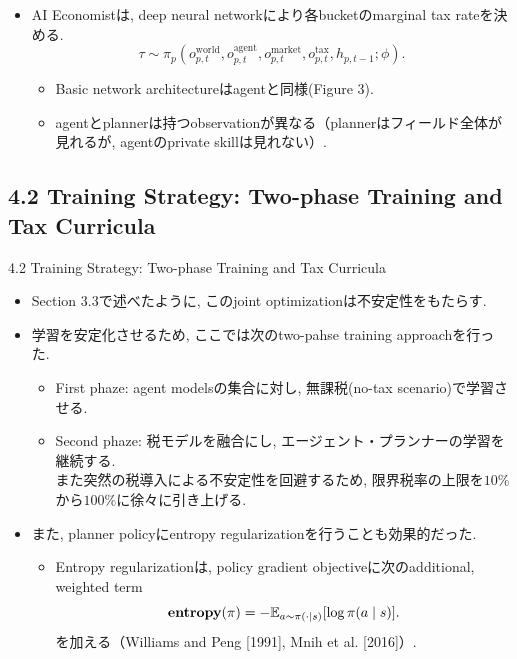 \documentclass[unicode,aspectratio=169,11pt]{beamer}
\begin{document}
\begin{frame}{}{}
    \begin{itemize}
        \item AI Economistは, deep neural networkにより各bucketのmarginal tax rateを決める.
        \[ \tau \sim \pi_p\left( o^{\mathrm{world}}_{p,t}, o^{\mathrm{agent}}_{p,t}, o^{\mathrm{market}}_{p,t}, o^{\mathrm{tax}}_{p,t}, h_{p, t-1} ; \phi \right). \tag{24} \]
        \begin{itemize}
            \item Basic network architectureはagentと同様(Figure 3).
            \item agentとplannerは持つobservationが異なる（plannerはフィールド全体が見れるが, agentのprivate skillは見れない）.
        \end{itemize}
    \end{itemize}
\end{frame}

\subsection{4.2 Training Strategy: Two-phase Training and Tax Curricula}
\begin{frame}{4.2 Training Strategy: Two-phase Training and Tax Curricula}
\begin{itemize}
    \item Section 3.3で述べたように, このjoint optimizationは不安定性をもたらす.
    \item 学習を安定化させるため, ここでは次のtwo-pahse training approachを行った.
    \begin{itemize}
        \item First phaze: agent modelsの集合に対し, 無課税(no-tax scenario)で学習させる.
        \item Second phaze: 税モデルを融合にし, エージェント・プランナーの学習を継続する.\\
                また突然の税導入による不安定性を回避するため, 限界税率の上限を$10\%$から$100\%$に徐々に引き上げる.
    \end{itemize}
    \item また, planner policyにentropy regularizationを行うことも効果的だった.
    \begin{itemize}
        \item Entropy regularizationは, policy gradient objectiveに次のadditional, weighted term
        \[ {\bf entropy}(\pi) = - \mathbb{E}_{a \sim \pi(\cdot \mid s)} [\log\pi(a \mid s)]. \]
        を加える（Williams and Peng [1991], Mnih et al. [2016]）.
    \end{itemize}
\end{itemize}
\end{frame}
\end{document}
